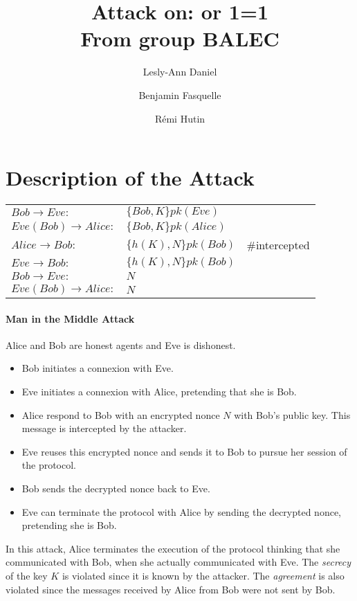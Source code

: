 \documentclass[10pt,a4paper]{article}
\author{
Lesly-Ann Daniel \and Benjamin Fasquelle \and Rémi Hutin\\
}
\title{
Attack on: or 1=1\\
From group \textsc{BALEC}
}
\begin{document}
\maketitle


\section{Description of the Attack}
\begin{table}[!h]
\centering
\begin{tabular}{lll}
$Bob \rightarrow Eve:$ & $ \{Bob,K\}pk(Eve) $\\
$Eve(Bob) \rightarrow Alice:$ & $ \{Bob,K\}pk(Alice) $ &\\
$Alice \rightarrow Bob:$ & $ \{ h(K),N \}pk(Bob) $ & \#intercepted \\ 
$Eve \rightarrow Bob:$ & $ \{ h(K),N \}pk(Bob) $ & \\
$Bob \rightarrow Eve:$ & $ N $ &\\
$Eve(Bob) \rightarrow Alice:$ & $ N $ &\\
\end{tabular}
\end{table}

\paragraph{Man in the Middle Attack}
Alice and Bob are honest agents and Eve is dishonest.
\begin{itemize}
 \item Bob initiates a connexion with Eve.
 \item Eve initiates a connexion with Alice, pretending that she is Bob.
 \item Alice respond to Bob with an encrypted nonce \(N\) with Bob's public key. This message is intercepted by the attacker.
 \item Eve reuses this encrypted nonce and sends it to Bob to pursue her session of the protocol.
 \item Bob sends the decrypted nonce back to Eve.
 \item Eve can terminate the protocol with Alice by sending the decrypted nonce, pretending she is Bob.
\end{itemize}

In this attack, Alice terminates the execution of the protocol thinking that she communicated with Bob, when she actually communicated with Eve. The {\em secrecy} of the key $K$ is violated since it is known by the attacker. The {\em agreement} is also violated since the messages received by Alice from Bob were not sent by Bob.

\end{document}
